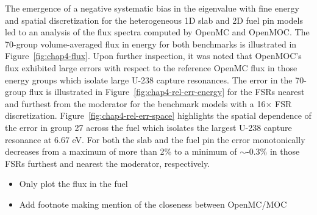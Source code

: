 The emergence of a negative systematic bias in the eigenvalue with fine energy and spatial discretization for the heterogeneous 1D slab and 2D fuel pin models led to an analysis of the flux spectra computed by OpenMC and OpenMOC. The 70-group volume-averaged flux in energy for both benchmarks is illustrated in Figure~\ref{fig:chap4-flux}. Upon further inspection, it was noted that OpenMOC's flux exhibited large errors with respect to the reference OpenMC flux in those energy groups which isolate large U-238 capture resonances. The error in the 70-group flux is illustrated in Figure~\ref{fig:chap4-rel-err-energy} for the \ac{FSR}s nearest and furthest from the moderator for the benchmark models with a 16$\times$ \ac{FSR} discretization. Figure~\ref{fig:chap4-rel-err-space} highlights the spatial dependence of the error in group 27 across the fuel which isolates the largest U-238 capture resonance at 6.67 eV. For both the slab and the fuel pin the error monotonically decreases from a maximum of more than 2\% to a minimum of $\sim$-0.3\% in those \ac{FSR}s furthest and nearest the moderator, respectively. 

\begin{itemize}[noitemsep]
  \item Only plot the flux in the fuel
  \item Add footnote making mention of the closeness between OpenMC/MOC
\end{itemize}

